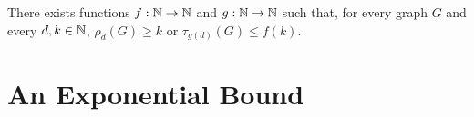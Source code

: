 \documentclass{patmorin}
\DeclareMathOperator{\girth}{girth}
\DeclareMathOperator{\dist}{dist}
\begin{document}
\begin{conj}
  There exists functions $f:\mathbb{N}\to\mathbb{N}$ and $g:\mathbb{N}\to\mathbb{N}$ such that, for every graph $G$ and every $d,k\in\mathbb{N}$, $\rho_d(G) \ge k$ or $\tau_{g(d)}(G)\le f(k)$.
\end{conj}


\section{An Exponential Bound}


%
%
%
\end{document}
